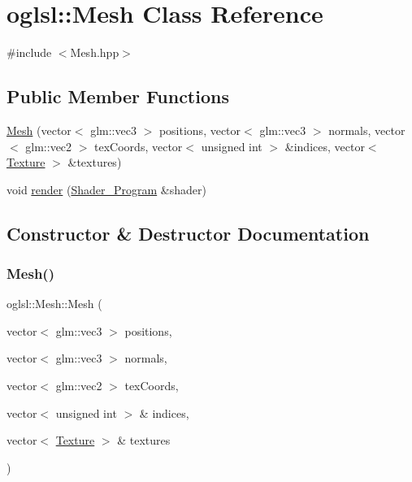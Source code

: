 \hypertarget{classoglsl_1_1_mesh}{}\section{oglsl\+:\+:Mesh Class Reference}
\label{classoglsl_1_1_mesh}


{\ttfamily \#include $<$Mesh.\+hpp$>$}

\subsection*{Public Member Functions}
\begin{DoxyCompactItemize}
\item 
\mbox{\hyperlink{classoglsl_1_1_mesh_ac8a19dfa3be1aa4a8c9396057f7b5c78}{Mesh}} (vector$<$ glm\+::vec3 $>$ positions, vector$<$ glm\+::vec3 $>$ normals, vector$<$ glm\+::vec2 $>$ tex\+Coords, vector$<$ unsigned int $>$ \&indices, vector$<$ \mbox{\hyperlink{namespaceoglsl_a3f3bf2d9553fda1a155d7492ee30d7d0}{Texture}} $>$ \&textures)
\item 
void \mbox{\hyperlink{classoglsl_1_1_mesh_a358dea364d978e49c8df22fa9ad62c21}{render}} (\mbox{\hyperlink{classoglsl_1_1_shader___program}{Shader\+\_\+\+Program}} \&shader)
\end{DoxyCompactItemize}


\subsection{Constructor \& Destructor Documentation}
\mbox{\label{classoglsl_1_1_mesh_ac8a19dfa3be1aa4a8c9396057f7b5c78}} 
\subsubsection{\texorpdfstring{Mesh()}{Mesh()}}
{\footnotesize\ttfamily oglsl\+::\+Mesh\+::\+Mesh (\begin{DoxyParamCaption}\item[{vector$<$ glm\+::vec3 $>$}]{positions,  }\item[{vector$<$ glm\+::vec3 $>$}]{normals,  }\item[{vector$<$ glm\+::vec2 $>$}]{tex\+Coords,  }\item[{vector$<$ unsigned int $>$ \&}]{indices,  }\item[{vector$<$ \mbox{\hyperlink{namespaceoglsl_a3f3bf2d9553fda1a155d7492ee30d7d0}{Texture}} $>$ \&}]{textures }\end{DoxyParamCaption})}



